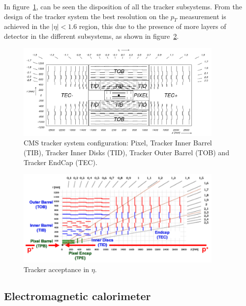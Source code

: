 In figure~\ref{fig:cmstracker}, can be seen the disposition of all the tracker subsystems. From the design of the tracker system the best resolution on the $p_{T}$ measurement is achieved in the $|\eta|<1.6$ region, this due to the presence of more layers of detector in the different subsystems, as shown in figure~\ref{fig:trackerres}. 

\begin{figure}[!Hhtbp]
  \begin{center}
    \includegraphics[width=0.9\textwidth]{figs/fig_cmstracker.png}
    \caption{CMS tracker system configuration: Pixel, Tracker Inner Barrel (TIB), Tracker Inner Disks (TID), Tracker Outer Barrel (TOB) and Tracker EndCap (TEC).}
    \label{fig:cmstracker}
  \end{center}
\end{figure}

\begin{figure}[!Hhtbp]
  \begin{center}
    \includegraphics[width=0.9\textwidth]{figs/tracker_resolution.png}
    \caption{Tracker acceptance in $\eta$. }
    \label{fig:trackerres}
  \end{center}
\end{figure}

\subsection{Electromagnetic calorimeter}
\label{sec:ecal}

